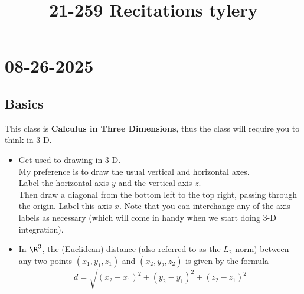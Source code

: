 \documentclass[]{mangos-musings}
\begin{document}
\title{21-259 Recitations \hfill \small{tylery}}
\tableofcontents

\newpage
\section{08-26-2025}
\subsection{Basics}
This class is \textbf{Calculus in Three Dimensions}, thus the class will require you to think in 3-D.
\begin{itemize}
  \item Get used to drawing in 3-D. 
  \\ My preference is to draw the usual vertical and horizontal axes. 
  \\ Label the horizontal axis $y$ and the vertical axis $z$. 
  \\ Then draw a diagonal from the bottom left to the top right, passing through the origin. Label this axis $x$.
  Note that you can interchange any of the axis labels as necessary (which will come in handy when we start doing 3-D integration). 
  \item In $\R^3$, the (Euclidean) distance (also referred to as the $L_2$ norm) between any two points $(x_1, y_1, z_1)$ and $(x_2, y_2, z_2)$
  is given by the formula 
  \[d = \sqrt{(x_2 - x_1)^2 + (y_2 - y_1)^2 + (z_2 - z_1)^2}\]
\end{itemize}
\end{document}
